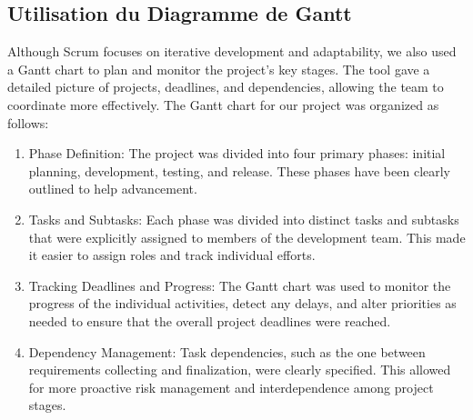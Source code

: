 \subsection{Utilisation du Diagramme de Gantt}
Although Scrum focuses on iterative development and adaptability, we also used a Gantt chart to plan and monitor the project's key stages. The tool gave a detailed picture of projects, deadlines, and dependencies, allowing the team to coordinate more effectively. The Gantt chart for our project was organized as follows:

\begin{enumerate}
  \item Phase Definition: The project was divided into four primary phases: initial planning, development, testing, and release. These phases have been clearly outlined to help advancement.
  \item Tasks and Subtasks: Each phase was divided into distinct tasks and subtasks that were explicitly assigned to members of the development team. This made it easier to assign roles and track individual efforts.
  \item Tracking Deadlines and Progress: The Gantt chart was used to monitor the progress of the individual activities, detect any delays, and alter priorities as needed to ensure that the overall project deadlines were reached.
  \item Dependency Management: Task dependencies, such as the one between requirements collecting and finalization, were clearly specified. This allowed for more proactive risk management and interdependence among project stages.
\end{enumerate}



